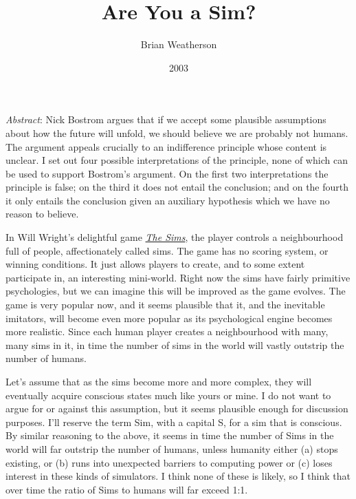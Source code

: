 \documentclass[
  11pt,
  letterpaper,
  DIV=11,
  numbers=noendperiod,
  twoside]{scrartcl}
\title{Are You a Sim?}
\author{Brian Weatherson}
\date{2003}
\renewenvironment{abstract}
 {\vspace{-1.25cm}
 \quotation\small\noindent\emph{Abstract}:}
 {\endquotation}
\renewenvironment{abstract}
 {\quotation\small\noindent\emph{Abstract}:}
 {\endquotation\vspace{-0.02cm}}
\begin{document}
\maketitle
\begin{abstract}
Nick Bostrom argues that if we accept some plausible assumptions about
how the future will unfold, we should believe we are probably not
humans. The argument appeals crucially to an indifference principle
whose content is unclear. I set out four possible interpretations of the
principle, none of which can be used to support Bostrom's argument. On
the first two interpretations the principle is false; on the third it
does not entail the conclusion; and on the fourth it only entails the
conclusion given an auxiliary hypothesis which we have no reason to
believe.
\end{abstract}


In Will Wright's delightful game \href{http://thesims.ea.com/}{\emph{The
Sims}}, the player controls a neighbourhood full of people,
affectionately called sims. The game has no scoring system, or winning
conditions. It just allows players to create, and to some extent
participate in, an interesting mini-world. Right now the sims have
fairly primitive psychologies, but we can imagine this will be improved
as the game evolves. The game is very popular now, and it seems
plausible that it, and the inevitable imitators, will become even more
popular as its psychological engine becomes more realistic. Since each
human player creates a neighbourhood with many, many sims in it, in time
the number of sims in the world will vastly outstrip the number of
humans.

Let's assume that as the sims become more and more complex, they will
eventually acquire conscious states much like yours or mine. I do not
want to argue for or against this assumption, but it seems plausible
enough for discussion purposes. I'll reserve the term Sim, with a
capital S, for a sim that is conscious. By similar reasoning to the
above, it seems in time the number of Sims in the world will far
outstrip the number of humans, unless humanity either (a) stops
existing, or (b) runs into unexpected barriers to computing power or (c)
loses interest in these kinds of simulators. I think none of these is
likely, so I think that over time the ratio of Sims to humans will far
exceed 1:1.
\end{document}
